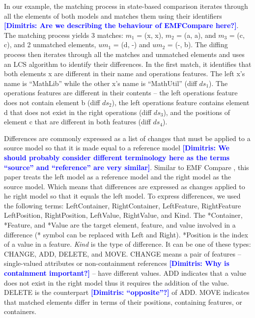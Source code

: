 \documentclass{jot}
\newcommand{\dk}[1]{\textcolor{blue}{\textbf{[Dimitris: #1]}}}
\begin{document}
In our example, the matching process in state-based comparison iterates through all the elements of both models and matches them using their identifiers \dk{Are we describing the behaviour of EMFCompare here?}. The matching process yields 3 matches: $m_1$ = (\textsf{x}, \textsf{x}), $m_2$ = (\textsf{a}, \textsf{a}), and $m_3$ = (\textsf{c}, \textsf{c}), and 2 unmatched elements, $um_1$ = (\textsf{d}, -) and $um_2$ = (-, \textsf{b}). The diffing process then iterates through all the matches and unmatched elements and uses an LCS algorithm to identify their differences. In the first match, it identifies that both elements \textsf{x} are different in their \textsf{name} and \textsf{operations} features. 
The left \textsf{x}'s \textsf{name} is ``MathLib'' while the other \textsf{x}'s \textsf{name} is ``MathUtil'' (diff $ds_1$). The \textsf{operations} features are different in their contents -- the left \textsf{operations} feature does not contain element \textsf{b} (diff $ds_2$), the left \textsf{operations} feature contains element \textsf{d} 
that does not exist in the right \textsf{operations} (diff $ds_3$), and the positions of element \textsf{c} that are different in both features (diff $ds_4$).

Differences are commonly expressed as a list of changes that must be applied to a source model so that it is made equal to a reference model \dk{We should probably consider different terminology here as the terms ``source'' and ``reference'' are very similar}.
Similar to EMF Compare \cite{emfcompare2018developer}, this paper treats the left model as a reference model and the right model as the source model.
Which means that differences are expressed as changes applied to he right model so that it equals the left model.
To express differences, we used the following terms: \textsf{LeftContainer}, \textsf{RightContainer}, \textsf{LeftFeature}, \textsf{RightFeature} \textsf{LeftPosition}, \textsf{RightPosition}, \textsf{LeftValue}, \textsf{RightValue}, and \textsf{Kind}. The \textsf{*Container}, \textsf{*Feature}, and \textsf{*Value} are the target element, feature, and value involved in a difference (\textsf{*} symbol can be replaced with \textsf{Left} and {Right}). \textsf{*Position} is the index of a value in a feature. \textit{Kind} is the type of difference. It can be one of these types: \textsf{CHANGE}, \textsf{ADD}, \textsf{DELETE}, and \textsf{MOVE}. \textsf{CHANGE} means a pair of features -- single-valued attributes or non-containment references \dk{Why is containment important?} -- have different values. \textsf{ADD} indicates that a value does not exist in the right model thus it requires the addition of the value. \textsf{DELETE} is the counterpart \dk{``opposite''?} of \textsf{ADD}. \textsf{MOVE} indicates that matched elements differ in terms of their positions, containing features, or containers. 
\end{document}
